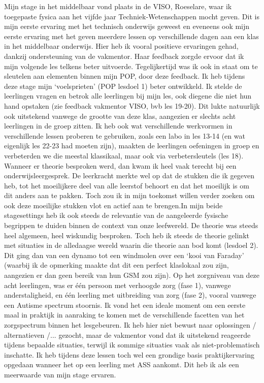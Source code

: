\documentclass[a4paper,12pt,twoside]{article}%
\begin{document}
Mijn stage in het middelbaar vond plaats in de VISO, Roeselare, waar ik toegepaste fysica aan het vijfde jaar Techniek-Wetenschappen mocht geven. Dit is mijn eerste ervaring met het technisch onderwijs geweest en eveneens ook mijn eerste ervaring met het geven meerdere lessen op verschillende dagen aan een klas in het middelbaar onderwijs. Hier heb ik vooral positieve ervaringen gehad, dankzij ondersteuning van de vakmentor. Haar feedback zorgde ervoor dat ik mijn volgende les telkens beter uitvoerde. Tegelijkertijd was ik ook in staat om te sleutelen aan elementen binnen mijn POP, door deze feedback. Ik heb tijdens deze stage mijn `voelsprieten' (POP lesdoel 1) beter ontwikkeld. Ik stelde de leerlingen vragen en betrok alle leerlingen bij mijn les, ook diegene die niet hun hand opstaken (zie feedback vakmentor VISO, bvb les 19-20). Dit lukte natuurlijk ook uitstekend vanwege de grootte van deze klas, aangezien er slechts acht leerlingen in de groep zitten. Ik heb ook wat verschillende werkvormen in verschillende lessen proberen te gebruiken, zoals een labo in les 13-14 (en wat eigenlijk les 22-23 had moeten zijn), maakten de leerlingen oefeningen in groep en verbeterden we die meestal klassikaal, maar ook via verbetersleutels (les 18). Wanneer er theorie besproken werd, dan kwam ik heel vaak terecht bij een onderwijsleergesprek. De leerkracht merkte wel op dat de stukken die ik gegeven heb, tot het moeilijkere deel van alle leerstof behoort en dat het moeilijk is om dit anders aan te pakken. Toch zou ik in mijn toekomst willen verder zoeken om ook deze moeilijke stukken vlot en actief aan te brengen.\newline In mijn beide stagesettings heb ik ook steeds de relevantie van de aangeleerde fysische begrippen te duiden binnen de context van onze leefwereld. De theorie was steeds heel algemeen, heel wiskundig besproken. Toch heb ik steeds de theorie gelinkt met situaties in de alledaagse wereld waarin die theorie aan bod komt (lesdoel 2). Dit ging dan van een dynamo tot een windmolen over een `kooi van Faraday' (waarbij ik de opmerking maakte dat dit een perfect klaslokaal zou zijn, aangezien er dan geen bereik van hun GSM zou zijn).  \newline
Op het zorgniveau van deze acht leerlingen, was er één persoon met verhoogde zorg (fase 1), vanwege anderstaligheid, en één leerling met uitbreiding van zorg (fase 2), vooral vanwege een Autisme spectrum stoornis. Ik vond het een ideale moment om een eerste maal in praktijk in aanraking te komen met de verschillende facetten van het zorgspectrum binnen het lesgebeuren. Ik heb hier niet bewust naar oplossingen / alternatieven /... gezocht, maar de vakmentor vond dat ik uitstekend reageerde tijdens bepaalde situaties, terwijl ik sommige situaties vaak als niet-problematisch inschatte. Ik heb tijdens deze lessen toch wel een grondige basis praktijkervaring opgedaan wanneer het op een leerling met ASS aankomt. Dit heb ik als een meerwaarde van mijn stage ervaren. \newline
\end{document}
